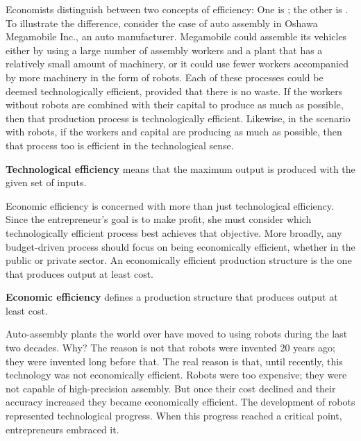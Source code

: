 \newhtmlpage

Economists distinguish
between two concepts of efficiency: One is ;
the other is . To illustrate
the difference, consider the case of auto assembly in Oshawa Megamobile Inc.,
an auto manufacturer. Megamobile could assemble its vehicles either by
using a large number of assembly workers and a plant that has a relatively
small amount of machinery, or it could use fewer workers accompanied by more
machinery in the form of robots. Each of these processes could be deemed
technologically efficient, provided that there is no waste. If the workers
without robots are combined with their capital to produce as much as
possible, then that production process is technologically efficient.
Likewise, in the scenario with robots, if the workers and capital are
producing as much as possible, then that process too is efficient in the
technological sense.

\begin{DefBox}
	\textbf{Technological efficiency} means that the maximum output is produced with the given set of inputs.
\end{DefBox}

Economic efficiency is concerned with more than just technological
efficiency. Since the entrepreneur's goal is to make profit, she must
consider which technologically efficient process best achieves that
objective. More broadly, any budget-driven process should focus on being
economically efficient, whether in the public or private sector. An
economically efficient production structure is the one that produces output
at least cost.

\begin{DefBox}
	\textbf{Economic efficiency} defines a production structure that produces output at least cost.
\end{DefBox}

Auto-assembly plants the world over have moved to using robots during the
last two decades. Why? The reason is not that robots were invented 20 years
ago; they were invented long before that. The real reason is that, until
recently, this technology was not economically efficient. Robots were too
expensive; they were not capable of high-precision assembly. But once their
cost declined and their accuracy increased they became economically
efficient. The development of robots represented technological progress.
When this progress reached a critical point, entrepreneurs embraced it.

